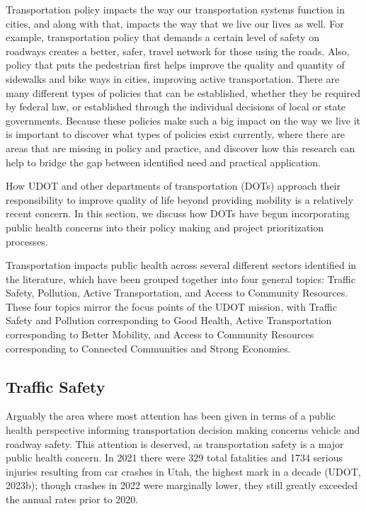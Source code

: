 \documentclass[
  letterpaper,
  DIV=11,
  numbers=noendperiod]{scrreport}
\begin{document}
Transportation policy impacts the way our transportation systems
function in cities, and along with that, impacts the way that we live
our lives as well. For example, transportation policy that demands a
certain level of safety on roadways creates a better, safer, travel
network for those using the roads. Also, policy that puts the pedestrian
first helps improve the quality and quantity of sidewalks and bike ways
in cities, improving active transportation. There are many different
types of policies that can be established, whether they be required by
federal law, or established through the individual decisions of local or
state governments. Because these policies make such a big impact on the
way we live it is important to discover what types of policies exist
currently, where there are areas that are missing in policy and
practice, and discover how this research can help to bridge the gap
between identified need and practical application.

How UDOT and other departments of transportation (DOTs) approach their
responsibility to improve quality of life beyond providing mobility is a
relatively recent concern. In this section, we discuss how DOTs have
begun incorporating public health concerns into their policy making and
project prioritization processes.

Transportation impacts public health across several different sectors
identified in the literature, which have been grouped together into four
general topics: Traffic Safety, Pollution, Active Transportation, and
Access to Community Resources. These four topics mirror the focus points
of the UDOT mission, with Traffic Safety and Pollution corresponding to
Good Health, Active Transportation corresponding to Better Mobility, and
Access to Community Resources corresponding to Connected Communities and
Strong Economies.

\hypertarget{traffic-safety}{%
\subsection{Traffic Safety}\label{traffic-safety}}

Arguably the area where most attention has been given in terms of a
public health perspective informing transportation decision making
concerns vehicle and roadway safety. This attention is deserved, as
transportation safety is a major public health concern. In 2021 there
were 329 total fatalities and 1734 serious injuries resulting from car
crashes in Utah, the highest mark in a decade (UDOT, 2023b); though
crashes in 2022 were marginally lower, they still greatly exceeded the
annual rates prior to 2020.
\end{document}
